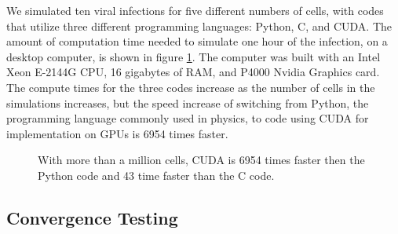 We simulated ten viral infections for five different numbers of cells, with codes that utilize three different programming languages: Python, C, and CUDA. The amount of computation time needed to simulate one hour of the infection, on a desktop computer, is shown in figure \ref{fig:SpeedComparison}. The computer was built with an Intel Xeon E-2144G CPU, 16 gigabytes of RAM, and P4000 Nvidia Graphics card. The compute times for the three codes increase as the number of cells in the simulations increases, but the speed increase of switching from Python, the programming language commonly used in physics, to code using CUDA for implementation on GPUs is 6954 times faster.
\begin{figure}
    \centering
\caption{With more than a million cells, CUDA is 6954 times faster then the Python code and 43 time faster than the C code. \label{fig:SpeedComparison}}
\end{figure}

\subsection{Convergence Testing}

